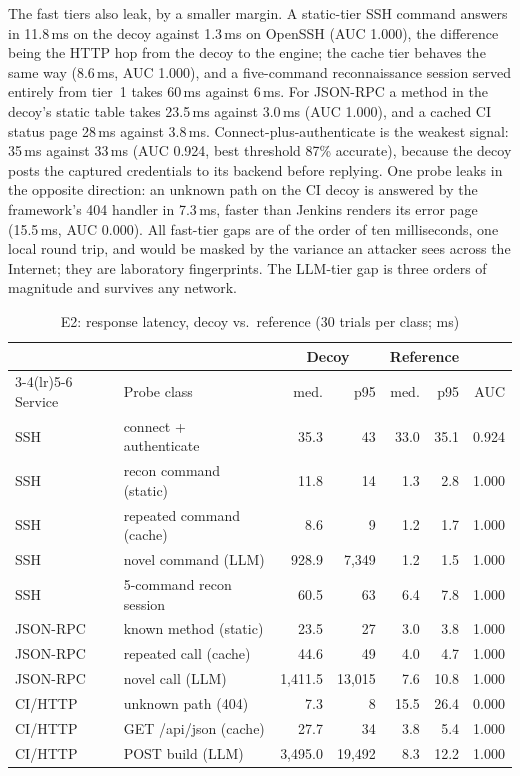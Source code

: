 \documentclass[conference]{IEEEtran}
\begin{document}
The fast tiers also leak, by a smaller margin. A static-tier SSH command answers in 11.8\,ms on the decoy against 1.3\,ms on OpenSSH (AUC 1.000), the difference being the HTTP hop from the decoy to the engine; the cache tier behaves the same way (8.6\,ms, AUC 1.000), and a five-command reconnaissance session served entirely from tier~1 takes 60\,ms against 6\,ms. For JSON-RPC a method in the decoy's static table takes 23.5\,ms against 3.0\,ms (AUC 1.000), and a cached CI status page 28\,ms against 3.8\,ms. Connect-plus-authenticate is the weakest signal: 35\,ms against 33\,ms (AUC 0.924, best threshold 87\% accurate), because the decoy posts the captured credentials to its backend before replying. One probe leaks in the opposite direction: an unknown path on the CI decoy is answered by the framework's 404 handler in 7.3\,ms, faster than Jenkins renders its error page (15.5\,ms, AUC 0.000). All fast-tier gaps are of the order of ten milliseconds, one local round trip, and would be masked by the variance an attacker sees across the Internet; they are laboratory fingerprints. The LLM-tier gap is three orders of magnitude and survives any network.

\begin{table}[!t]
\caption{E2: response latency, decoy vs.\ reference (30 trials per class; ms)}
\label{tab:timing}
\centering
\scriptsize
\renewcommand{\arraystretch}{1.15}
\setlength{\tabcolsep}{3.5pt}
\begin{tabular}{@{}llrrrrr@{}}
\toprule
& & \multicolumn{2}{c}{Decoy} & \multicolumn{2}{c}{Reference} & \\
\cmidrule(lr){3-4}\cmidrule(lr){5-6}
Service & Probe class & med. & p95 & med. & p95 & AUC \\
\midrule
SSH & connect + authenticate & 35.3 & 43 & 33.0 & 35.1 & 0.924 \\
SSH & recon command (static) & 11.8 & 14 & 1.3 & 2.8 & 1.000 \\
SSH & repeated command (cache) & 8.6 & 9 & 1.2 & 1.7 & 1.000 \\
SSH & novel command (LLM) & 928.9 & 7,349 & 1.2 & 1.5 & 1.000 \\
SSH & 5-command recon session & 60.5 & 63 & 6.4 & 7.8 & 1.000 \\
JSON-RPC & known method (static) & 23.5 & 27 & 3.0 & 3.8 & 1.000 \\
JSON-RPC & repeated call (cache) & 44.6 & 49 & 4.0 & 4.7 & 1.000 \\
JSON-RPC & novel call (LLM) & 1,411.5 & 13,015 & 7.6 & 10.8 & 1.000 \\
CI/HTTP & unknown path (404) & 7.3 & 8 & 15.5 & 26.4 & 0.000 \\
CI/HTTP & GET /api/json (cache) & 27.7 & 34 & 3.8 & 5.4 & 1.000 \\
CI/HTTP & POST build (LLM) & 3,495.0 & 19,492 & 8.3 & 12.2 & 1.000 \\
\bottomrule
\end{tabular}
\end{table}
\end{document}
